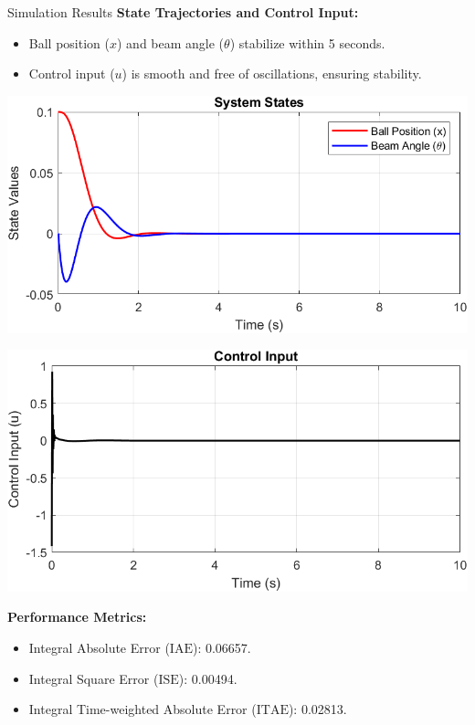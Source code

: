 \documentclass{beamer}
\begin{document}
\begin{frame}{Simulation Results}
    \textbf{State Trajectories and Control Input:}
    \begin{itemize}
        \item Ball position (\(x\)) and beam angle (\(\theta\)) stabilize within 5 seconds.
        \item Control input (\(u\)) is smooth and free of oscillations, ensuring stability.
    \end{itemize}
    \begin{minipage}[t]{0.48\textwidth}
        \includegraphics[width=\textwidth]{Figures/state_sim.png}
    \end{minipage}
    \hfill
    \begin{minipage}[t]{0.48\textwidth}
        \includegraphics[width=\textwidth]{Figures/control_input_sim.png}
    \end{minipage}
    \textbf{Performance Metrics:}
    \begin{itemize}
        \item Integral Absolute Error (\(\text{IAE}\)): 0.06657.
        \item Integral Square Error (\(\text{ISE}\)): 0.00494.
        \item Integral Time-weighted Absolute Error (\(\text{ITAE}\)): 0.02813.
    \end{itemize}
\end{frame}
\end{document}
